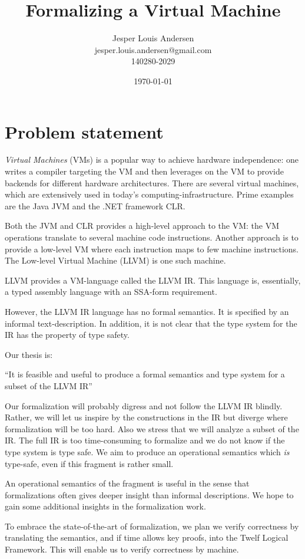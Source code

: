 \documentclass[a4paper, oneside, 10pt, final]{memoir}
\author{Jesper Louis
  Andersen\\jesper.louis.andersen@gmail.com\\140280-2029}
\title{Formalizing a Virtual Machine}
\date{\today}
\begin{document}
\maketitle{}
\chapter*{Problem statement}

\emph{Virtual Machines} (VMs) is a popular way to achieve hardware
independence: one writes a compiler targeting the VM and then
leverages on the VM to provide backends for different hardware
architectures. There are several virtual machines, which are
extensively used in today's computing-infrastructure. Prime examples
are the Java JVM and the .NET framework CLR.

Both the JVM and CLR provides a high-level approach to the VM: the VM
operations translate to several machine code instructions. Another
approach is to provide a low-level VM where each instruction maps to
few machine instructions. The Low-level Virtual Machine (LLVM) is one
such machine.

LLVM provides a VM-language called the LLVM IR. This language is,
essentially, a typed assembly language with an
SSA-form\cite{appel:1998:modern} requirement.

However, the LLVM IR language has no formal semantics. It is specified by an
informal text-description. In addition, it is not clear that the type
system for the IR has the property of type safety\cite{pierce:2002:types}.

Our thesis is:
\begin{center}
  ``It is feasible and useful to produce a formal semantics and type
  system for a subset of the LLVM IR''
\end{center}
Our formalization will probably digress and not follow the LLVM IR
blindly. Rather, we will let us inspire by the constructions in the IR
but diverge where formalization will be too hard. Also we stress that
we will analyze a subset of the IR. The full IR is too time-consuming
to formalize and we do not know if the type system is type safe. We
aim to produce an operational semantics which \emph{is} type-safe,
even if this fragment is rather small.

An operational semantics of the fragment is useful in the sense that
formalizations often gives deeper insight than informal
descriptions. We hope to gain some additional insights in the
formalization work.

To embrace the state-of-the-art of formalization, we plan we verify
correctness by translating the semantics, and if time allows key
proofs, into the Twelf Logical Framework. This will enable us to
verify correctness by machine.
\end{document}
